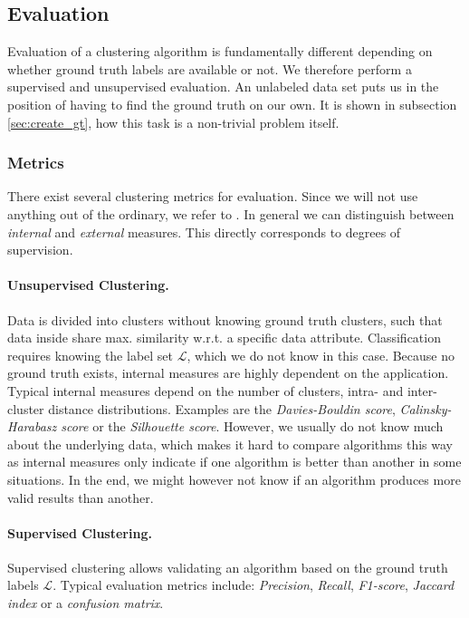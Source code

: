 \subsection{Evaluation}
Evaluation of a clustering algorithm is fundamentally different depending on whether ground truth labels are available or not. We therefore perform a supervised and unsupervised evaluation. An unlabeled data set puts us in the position of having to find the ground truth on our own. It is shown in subsection \ref{sec:create_gt}, how this task is a non-trivial problem itself. 

\subsubsection{Metrics}
There exist several clustering metrics for evaluation. Since we will not use anything out of the ordinary, we refer to \cite{aggarwal2015data}. In general we can distinguish between \textit{internal} and \textit{external} measures. This directly corresponds to degrees of supervision.

\paragraph{Unsupervised Clustering.}
Data is divided into clusters without knowing ground truth clusters, such that data inside share max. similarity w.r.t. a specific data attribute. Classification requires knowing the label set $ \mathcal{L} $, which we do not know in this case. Because no ground truth exists, internal measures are highly dependent on the application. Typical internal measures depend on the number of clusters, intra- and inter-cluster distance distributions. Examples are the \textit{Davies-Bouldin score}, \textit{Calinsky-Harabasz score} or the \textit{Silhouette score}. However, we usually do not know much about the underlying data, which makes it hard to compare algorithms this way as internal measures only indicate if one algorithm is better than another in some situations. In the end, we might however not know if an algorithm produces more valid results than another.

\paragraph{Supervised Clustering.}
Supervised clustering allows validating an algorithm based on the ground truth labels $ \mathcal{L} $. Typical evaluation metrics include: \textit{Precision}, \textit{Recall}, \textit{F1-score}, \textit{Jaccard index} or a \textit{confusion matrix}. 

